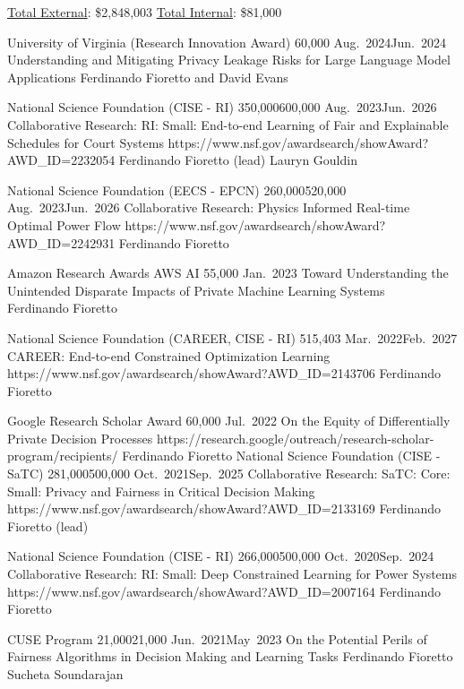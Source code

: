 
\begin{keywords}
{\underline{Total External}: \$2,848,003 %
\hspace{8pt} \underline{Total Internal}: \$81,000}%
\end{keywords}

\begin{projects}
	\grantentrySinglePI
	{University of Virginia (Research Innovation Award)}
	{60,000}
	{Aug.~2024}{Jun.~2024}
	{Understanding and Mitigating Privacy Leakage Risks for Large Language Model Applications}
	{}
	{Ferdinando Fioretto and David Evans}

	\grantentrycoPI
	{National Science Foundation (CISE - RI)}
	{350,000}{600,000}
	{Aug.~2023}{Jun.~2026}
	{Collaborative Research: RI: Small: End-to-end Learning of Fair and Explainable Schedules for Court Systems}
	{https://www.nsf.gov/awardsearch/showAward?AWD_ID=2232054}
	{Ferdinando Fioretto (lead)}
	{Lauryn Gouldin}

\end{projects}

\begin{projects}

	\grantentryPI
	{National Science Foundation (EECS - EPCN)}
	{260,000}{520,000}
	{Aug.~2023}{Jun.~2026}
	{Collaborative Research: Physics Informed Real-time Optimal Power Flow}
	{https://www.nsf.gov/awardsearch/showAward?AWD_ID=2242931}
	{Ferdinando Fioretto}

	\grantentrySinglePI
	{Amazon Research Awards AWS AI}
	{55,000}
	{Jan.~2023}{}
	{Toward Understanding the Unintended Disparate Impacts of  Private Machine Learning Systems}
	{~}
	{Ferdinando Fioretto}

	\grantentrySinglePI
	{National Science Foundation (CAREER, CISE - RI)}
	{515,403}
	{Mar.~2022}{Feb.~2027}
	{CAREER: End-to-end Constrained Optimization Learning}
	{https://www.nsf.gov/awardsearch/showAward?AWD_ID=2143706}
	{Ferdinando Fioretto}	
	
	\grantentrySinglePI
	{Google Research Scholar Award}
	{60,000}
	{Jul.~2022}{}
	{On the Equity of Differentially Private Decision Processes}
	{https://research.google/outreach/research-scholar-program/recipients/}
	{Ferdinando Fioretto}
	\grantentryPI
	{National Science Foundation (CISE - SaTC)}
	{281,000}{500,000}
	{Oct.~2021}{Sep.~2025}
	{Collaborative Research: SaTC: Core: Small: Privacy and Fairness in Critical Decision Making}
	{https://www.nsf.gov/awardsearch/showAward?AWD_ID=2133169}
	{Ferdinando Fioretto (lead)}

	\grantentryPI
	{National Science Foundation (CISE - RI)}
	{266,000}{500,000}
	{Oct.~2020}{Sep.~2024}
	{Collaborative Research: RI: Small: Deep Constrained Learning for Power Systems}
	{https://www.nsf.gov/awardsearch/showAward?AWD_ID=2007164}
	{Ferdinando Fioretto}

\grantentrycoPI
	{CUSE Program}
	{21,000}{21,000}
	{Jun.~2021}{May~2023}
	{On the Potential Perils of Fairness Algorithms in Decision Making and Learning Tasks}
	{}
	{Ferdinando Fioretto}
	{Sucheta Soundarajan}
\end{projects}

